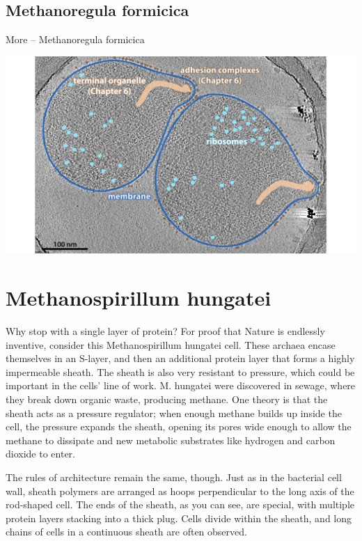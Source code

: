 \documentclass[]{tufte-book}
\begin{document}
\subsection{Methanoregula formicica}\label{methanoregula-formicica}

More -- Methanoregula formicica

\includegraphics{img/02_static/2_1_Mgenitalium}

\section{Methanospirillum hungatei}\label{methanospirillum-hungatei}

Why stop with a single layer of protein? For proof that Nature is
endlessly inventive, consider this Methanospirillum hungatei cell. These
archaea encase themselves in an S-layer, and then an additional protein
layer that forms a highly impermeable sheath. The sheath is also very
resistant to pressure, which could be important in the cells' line of
work. M. hungatei were discovered in sewage, where they break down
organic waste, producing methane. One theory is that the sheath acts as
a pressure regulator; when enough methane builds up inside the cell, the
pressure expands the sheath, opening its pores wide enough to allow the
methane to dissipate and new metabolic substrates like hydrogen and
carbon dioxide to enter.

The rules of architecture remain the same, though. Just as in the
bacterial cell wall, sheath polymers are arranged as hoops perpendicular
to the long axis of the rod-shaped cell. The ends of the sheath, as you
can see, are special, with multiple protein layers stacking into a thick
plug. Cells divide within the sheath, and long chains of cells in a
continuous sheath are often observed.
\end{document}
